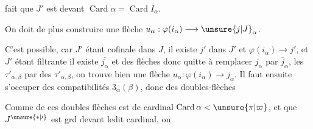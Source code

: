 
fait que $J'$ est  devant  $\operatorname{Card}\alpha=\operatorname{Card} I_\alpha$.

On doit de plus construire une flèche $u_\alpha:\varphi(i_\alpha)\longrightarrow\unsure{j|J}_\alpha$.

 C'est possible, car  $J'$ étant cofinale dans $J$, il existe $j'$ dans $J'$ et $\varphi(i_\alpha)\longrightarrow j'$, et $J'$ étant filtrante il existe $\overline{j_\alpha}$ et des flèches
donc quitte à remplacer $j_\alpha$ par $\overline{j}_\alpha$, les $\tau'_{\alpha,\beta}$ par des $\overline{\tau'_{\alpha,\beta}}$, on trouve bien une flèche  $u_\alpha:\varphi(i_\alpha)\longrightarrow j_\alpha$. Il faut ensuite  s'occuper des compatibilités $3_\alpha(\beta)$,  donc des  doubles-flèches

Comme  de ces doubles flèches est de cardinal $\operatorname{Card}\alpha<\unsure{\pi|\varpi}$, et que $J^{\unsure{*|\prime}}$ est grd devant ledit cardinal, on
